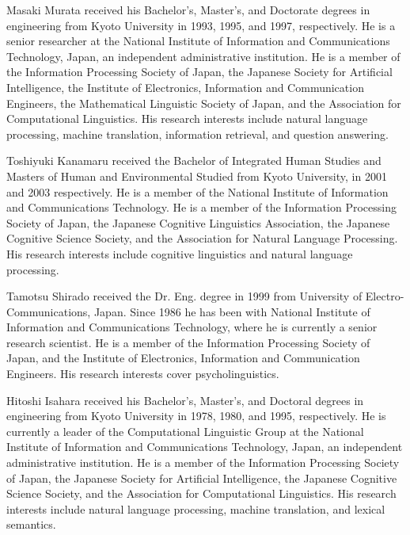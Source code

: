 \documentclass[english]{jnlp_1.2c}
\begin{document}
\begin{biography}

{Masaki Murata received his Bachelor's,
  Master's, and Doctorate degrees in engineering from Kyoto University in 1993, 1995, 
  and 1997, respectively.  
He is a senior researcher at the National Institute of Information and Communications Technology, Japan, 
an independent administrative institution.  
He is a member of the Information Processing Society of Japan,
the Japanese Society for Artificial Intelligence, 
the Institute of Electronics, Information and Communication Engineers,
the Mathematical Linguistic Society of Japan, 
and the Association for Computational Linguistics.
His research interests include natural language processing, machine translation, 
information retrieval, and question answering.
}


{
Toshiyuki Kanamaru received 
the Bachelor of Integrated Human Studies 
and Masters of Human and Environmental Studied 
from Kyoto University, in 2001 and 2003 respectively.
He is a member of the National Institute of Information 
and Communications Technology.
He is a member of the Information Processing Society of Japan,
the Japanese Cognitive Linguistics Association,
the Japanese Cognitive Science Society,
and the Association for Natural Language Processing.
His research interests include cognitive linguistics and 
natural language processing.
}

{
Tamotsu Shirado received the Dr. Eng. degree in 1999 from University of
Electro-Communications, Japan. Since 1986 he has been with National
Institute of Information and Communications Technology, where he
is currently a senior research scientist.
He is a member of the Information Processing Society of Japan,
and the Institute of Electronics, Information and Communication Engineers.
His research interests cover psycholinguistics.
}

{
Hitoshi Isahara received his Bachelor's,
Master's, and Doctoral degrees in engineering from Kyoto University in 1978, 1980,
and 1995, respectively.  He is currently a leader of the Computational Linguistic Group  
at the National Institute of Information and Communications Technology, Japan, 
an independent administrative institution.  
He is a member of the Information Processing Society of Japan, 
the Japanese Society for Artificial Intelligence, 
the Japanese Cognitive Science Society, 
and the Association for Computational Linguistics.
His research
interests include natural language processing, machine translation, and
lexical semantics.
}

\end{biography}


\biodate
\end{document}
